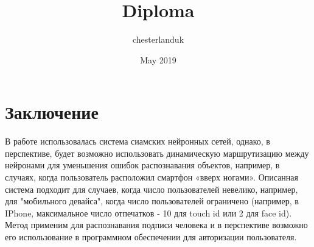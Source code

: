 \documentclass[utf8x]{G7-32} %
\title{Diploma}
\author{chesterlanduk }
\date{May 2019}
\begin{document}
\frontmatter
\setcounter{page}{2}

\makeatletter
\renewcommand{\@dotsep}{10000} 
\makeatother

\tableofcontents



\Introduction


\mainmatter %

% 
















\backmatter %

\chapter{Заключение}

В работе использовалась система сиамских нейронных сетей, однако, в перспективе, будет возможно использовать динамическую маршрутизацию между нейронами для уменьшения ошибок распознавания объектов, например, в случаях, когда пользователь расположил смартфон «вверх ногами».
Описанная система подходит для случаев, когда число пользователей невелико, например, для "мобильного девайса", когда число пользователей ограничено (например, в IPhone, максимальное число отпечатков - 10 для touch id или 2 для face id). 
Метод применим для распознавания подписи человека и в перспективе возможно его использование в программном обеспечении для авторизации пользователя.


\end{document}
